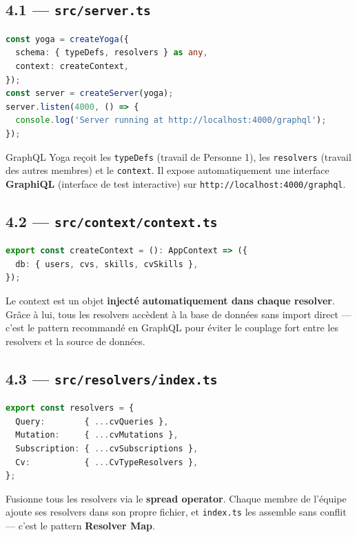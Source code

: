 \documentclass[12pt,a4paper]{article}
\begin{document}
\subsection{4.1 --- \texttt{src/server.ts}}

\begin{lstlisting}[language=TypeScript, caption={Point d'entrée du serveur}]
const yoga = createYoga({
  schema: { typeDefs, resolvers } as any,
  context: createContext,
});
const server = createServer(yoga);
server.listen(4000, () => {
  console.log('Server running at http://localhost:4000/graphql');
});
\end{lstlisting}

GraphQL Yoga reçoit les \texttt{typeDefs} (travail de Personne 1), les \texttt{resolvers} (travail des autres membres) et le \texttt{context}. Il expose automatiquement une interface \textbf{GraphiQL} (interface de test interactive) sur \texttt{http://localhost:4000/graphql}.

\subsection{4.2 --- \texttt{src/context/context.ts}}

\begin{lstlisting}[language=TypeScript, caption={Configuration du Context}]
export const createContext = (): AppContext => ({
  db: { users, cvs, skills, cvSkills },
});
\end{lstlisting}

Le context est un objet \textbf{injecté automatiquement dans chaque resolver}. Grâce à lui, tous les resolvers accèdent à la base de données sans import direct --- c'est le pattern recommandé en GraphQL pour éviter le couplage fort entre les resolvers et la source de données.

\subsection{4.3 --- \texttt{src/resolvers/index.ts}}

\begin{lstlisting}[language=TypeScript, caption={Fusion des resolvers}]
export const resolvers = {
  Query:        { ...cvQueries },
  Mutation:     { ...cvMutations },
  Subscription: { ...cvSubscriptions },
  Cv:           { ...CvTypeResolvers },
};
\end{lstlisting}

Fusionne tous les resolvers via le \textbf{spread operator}. Chaque membre de l'équipe ajoute ses resolvers dans son propre fichier, et \texttt{index.ts} les assemble sans conflit --- c'est le pattern \textbf{Resolver Map}.
\end{document}
